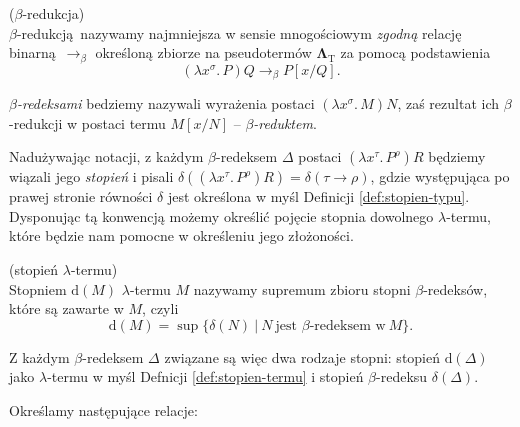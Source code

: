 \begin{definicja}(\(\beta\)-redukcja)\\
  \(\beta\)-redukcją nazywamy najmniejsza w sensie mnogościowym \emph{zgodną} relację binarną \(\longrightarrow_{\beta}\) określoną zbiorze na pseudotermów \(\mathbf{\Lambda}_{\mathrm{T}}\) za pomocą podstawienia
  \[
    (\lambda x^\sigma.\,P)Q \longrightarrow_{\beta} P[x/Q].
  \]
  
  \emph{\(\beta\)-redeksami} bedziemy nazywali wyrażenia postaci \((\lambda x^\sigma.\, M)N\), zaś rezultat ich \(\beta\)-redukcji w postaci termu \(M[x/N]\) -- \emph{\(\beta\)-reduktem}.

  Nadużywając notacji, z każdym \(\beta\)-redeksem \(\Delta\) postaci \((\lambda x^\tau .\,P^\rho)R\) będziemy wiązali jego \emph{stopień} i pisali \(\delta((\lambda x^\tau .\,P^\rho)R)=\delta(\tau\to\rho)\), gdzie występująca po prawej stronie równości \(\delta\) jest określona w myśl Definicji \ref{def:stopien-typu}. Dysponując tą konwencją możemy określić pojęcie stopnia dowolnego \(\lambda\)-termu, które będzie nam pomocne w określeniu jego złożoności.

\begin{definicja}\label{def:stopien-termu}(stopień \(\lambda\)-termu)\\
  Stopniem \(\mathrm{d}(M)\) \(\lambda\)-termu \(M\) nazywamy supremum zbioru stopni \(\beta\)-redeksów, które są zawarte w \(M\), czyli
  \[\mathrm{d}(M)=\sup\{\delta(N) \:|\:N\ \text{jest \(\beta\)-redeksem w}\ M\}.\]
\end{definicja}

\begin{uwaga*}
  Z każdym \(\beta\)-redeksem \(\Delta\) związane są więc dwa rodzaje stopni: stopień \(\mathrm{d}(\Delta)\) jako \(\lambda\)-termu w myśl Defnicji \ref{def:stopien-termu} i stopień \(\beta\)-redeksu \(\delta(\Delta)\).
\end{uwaga*}

%

\end{definicja}
\noindent Określamy następujące relacje:
